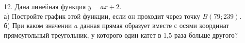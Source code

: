 12. Дана линейная функция $y=ax+2.$\\
а) Постройте график этой функции, если он проходит через точку $B(79;239).$\\
б) При каком значении $a$ данная прямая образует вместе с осями координат прямоугольный треугольник, у которого один катет в 1,5 раза больше другого?\\
